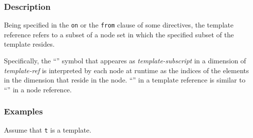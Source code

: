 \subsubsection*{Description}

Being specified in the {\tt on} or the {\tt from} clause of some
directives, the template reference refers to a subset of a node set
in which the specified subset of the template resides.

Specifically, the ``{\tt *}'' symbol that appeares as {\it
template-subscript} in a dimension of {\it template-ref} is interpreted
by each node at runtime as the indices of the elements in the dimension
that reside in the node. ``{\tt *}'' in a template reference is
similar to ``{\tt *}'' in a node reference.

%


\subsubsection*{Examples}

Assume that {\tt t} is a template.

